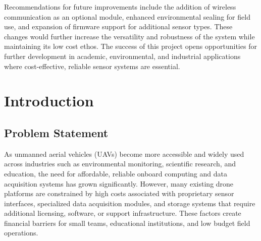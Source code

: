 \documentclass[12pt]{article}
\begin{document}
\par Recommendations for future improvements include the addition of wireless communication as an optional module, enhanced environmental sealing for field use, and expansion of firmware support for additional sensor types. These changes would further increase the versatility and robustness of the system while maintaining its low cost ethos. The success of this project opens opportunities for further development in academic, environmental, and industrial applications where cost-effective, reliable sensor systems are essential.

\newpage
\tableofcontents
\newpage

\section{Introduction}
\subsection{Problem Statement}

\par As unmanned aerial vehicles (UAVs) become more accessible and widely used across industries such as environmental monitoring, scientific research, and education, the need for affordable, reliable onboard computing and data acquisition systems has grown significantly. However, many existing drone platforms are constrained by high costs associated with proprietary sensor interfaces, specialized data acquisition modules, and storage systems that require additional licensing, software, or support infrastructure. These factors create financial barriers for small teams, educational institutions, and low budget field operations.
\end{document}
